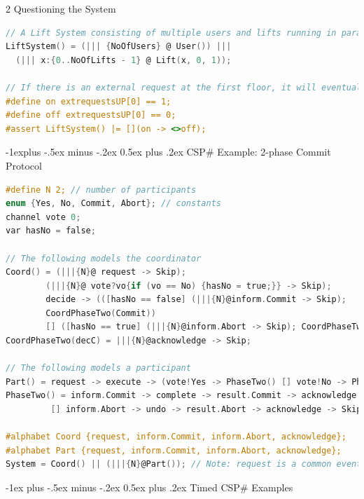 \documentclass[10pt, landscape]{article}
\makeatletter
\renewcommand{\section}{\@startsection{section}{1}{0mm}%
  {-1ex plus -.5ex minus -.2ex}%
  {0.5ex plus .2ex}%
{\normalfont\large\bfseries}}
\renewcommand{\subsection}{\@startsection{subsection}{2}{0mm}%
  {-1explus -.5ex minus -.2ex}%
  {0.5ex plus .2ex}%
{\normalfont\normalsize\bfseries}}
\makeatother
\begin{document}
\begin{multicols*}{2}
  Questioning the System
\begin{lstlisting}[language=C, basicstyle=\scriptsize\selectfont\ttfamily, mathescape]
// A Lift System consisting of multiple users and lifts running in parallel
LiftSystem() = (||| {NoOfUsers} @ User()) ||| 
  (||| x:{0..NoOfLifts - 1} @ Lift(x, 0, 1));

// If there is an external request at the first floor, it will eventually be served.
#define on extrequestsUP[0] == 1;
#define off extrequestsUP[0] == 0;
#assert LiftSystem() |= [](on -> <>off);
\end{lstlisting}

  \subsection{CSP\# Example: 2-phase Commit Protocol}
\begin{lstlisting}[language=C, basicstyle=\scriptsize\selectfont\ttfamily, mathescape]
#define N 2; // number of participants
enum {Yes, No, Commit, Abort}; // constants
channel vote 0;
var hasNo = false;

// The following models the coordinator
Coord() = (|||{N}@ request -> Skip); 
        (|||{N}@ vote?vo{if (vo == No) {hasNo = true;}} -> Skip);
        decide -> (([hasNo == false] (|||{N}@inform.Commit -> Skip); 
        CoordPhaseTwo(Commit))
        [] ([hasNo == true] (|||{N}@inform.Abort -> Skip); CoordPhaseTwo(Abort)));
CoordPhaseTwo(decC) = |||{N}@acknowledge -> Skip;

// The following models a participant
Part() = request -> execute -> (vote!Yes -> PhaseTwo() [] vote!No -> PhaseTwo());
PhaseTwo() = inform.Commit -> complete -> result.Commit -> acknowledge -> Skip 
         [] inform.Abort -> undo -> result.Abort -> acknowledge -> Skip;

#alphabet Coord {request, inform.Commit, inform.Abort, acknowledge};
#alphabet Part {request, inform.Commit, inform.Abort, acknowledge};
System = Coord() || (|||{N}@Part()); // Note: request is a common event between Coord and Part and has to be synchronised.
\end{lstlisting}
  \vspace*{\fill}
  \columnbreak

  \section{Timed CSP\# Examples}

\end{multicols*}
\end{document}
